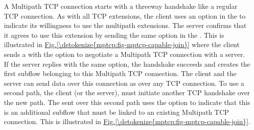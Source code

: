 \documentclass[letterpaper,10pt,english]{sphinxmanual}
\begin{document}
\sphinxAtStartPar
A Multipath TCP connection starts with a three\sphinxhyphen{}way handshake like a regular TCP connection. As with all TCP extensions, the client uses an option in the  to indicate its willingness to use the multipath extensions. The server confirms that it agrees to use this extension by sending the same option in the .  This is illustrated in \hyperref[\detokenize{mptcp:fig-mptcp-capable-join}]{Fig.\@ \ref{\detokenize{mptcp:fig-mptcp-capable-join}}} where the client sends a  with the  option to negotiate a Multipath TCP connection with a server. If the server replies with the same option, the handshake succeeds and creates the first subflow belonging to this Multipath TCP connection. The client and the server can send data over this connection as over any TCP connection. To use a second path, the client (or the server), must initiate another TCP handshake over the new path. The  sent over this second path uses the  option to indicate that this is an additional subflow that must be linked to an existing Multipath TCP connection. This is illustrated in \hyperref[\detokenize{mptcp:fig-mptcp-capable-join}]{Fig.\@ \ref{\detokenize{mptcp:fig-mptcp-capable-join}}}.
\end{document}
